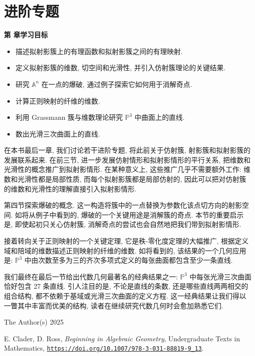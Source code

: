\chapter{进阶专题}\label{chap:rational-maps}

\noindent\textbf{第 \thechapter{} 章学习目标}
\begin{itemize}
  \item 描述拟射影簇上的有理函数和拟射影簇之间的有理映射.
  \item 定义拟射影簇的维数, 切空间和光滑性, 并引入仿射簇理论的关键结果.
  \item 研究 $\mathbb{A}^{n}$ 在一点的爆破, 通过例子探索它如何用于消解奇点.
  \item 计算正则映射的纤维的维数.
  \item 利用 Grassmann 簇与维数理论研究 $\mathbb{P}^{3}$ 中曲面上的直线.
  \item 数出光滑三次曲面上的直线.
\end{itemize}

在本书最后一章, 我们讨论若干进阶专题, 将此前关于仿射簇, 射影簇和拟射影簇的发展联系起来. 在前三节, 进一步发展仿射情形和拟射影情形的平行关系, 把维数和光滑性的概念推广到拟射影情形. 在某种意义上, 这些推广几乎不需要额外工作: 维数和光滑性都是局部性质, 而每个拟射影簇都是局部仿射的, 因此可以把对仿射簇的维数和光滑性的理解直接引入拟射影情形.

第四节探索\textquotedbl{}爆破\textquotedbl{}的概念. 这一构造将簇中的一点替换为参数化该点切方向的射影空间. 如将从例子中看到的, 爆破的一个关键用途是消解簇的奇点. 本节的重要启示是, 即使起初只关心仿射簇, 消解奇点的尝试也会自然地把我们带到拟射影情形.

接着转向关于正则映射的一个关键定理, 它是秩-零化度定理的大幅推广, 根据定义域和陪域的维数描述正则映射的\textquotedbl{}纤维\textquotedbl{}的维数. 如将看到的, 该结果的一个几何应用是: $\mathbb{P}^{3}$ 中由次数至多为三的齐次多项式定义的每张曲面都包含至少一条直线.

我们最终在最后一节给出代数几何最著名的经典结果之一: $\mathbb{P}^{3}$ 中每张光滑三次曲面恰好包含 27 条直线. 引人注目的是, 不论是直线的条数, 还是哪些直线两两相交的组合结构, 都不依赖于基域或光滑三次曲面的定义方程. 这一经典结果让我们得以一瞥其中丰富而优美的结构, 读者在继续研究代数几何时会愈加熟悉它们.

\par\smallskip
{\footnotesize
\noindent\textcopyright{} The Author(s) 2025\par
\noindent E. Clader, D. Ross, \emph{Beginning in Algebraic Geometry}, Undergraduate Texts in Mathematics,
\href{https://doi.org/10.1007/978-3-031-88819-9_13}{\nolinkurl{https://doi.org/10.1007/978-3-031-88819-9_13}}.\par}
